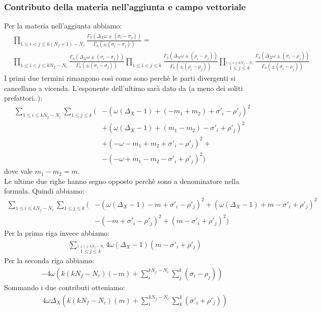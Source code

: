\documentclass[a4paper,12pt]{article}
\begin{document}
\subsubsection{Contributo della materia nell'aggiunta e campo vettoriale }
Per la materia nell'aggiunta abbiamo:
\begin{align*}
& \prod_{ 1 \leq i<j \leq k(N_f+1)- N_c } \frac{ \Gamma_h( \Delta_X \omega \pm (\sigma_i - \sigma_j)) }{ \Gamma_h ( \pm (\sigma_i - \sigma_j) )} = \\
& \prod_{ 1 \leq i<j \leq kN_f- N_c } \frac{ \Gamma_h( \Delta_X \omega \pm (\sigma_i - \sigma_j)) }{ \Gamma_h ( \pm (\sigma_i - \sigma_j) )} 
 \prod_{ 1 \leq i<j \leq k } \frac{ \Gamma_h( \Delta_X \omega \pm (\rho_i - \rho_j)) }{ \Gamma_h ( \pm (\rho_i - \rho_j) )} 
 \prod_{ \overset{1 \leq i \leq kN_f- N_c }{ 1 \leq j \leq k }} \frac{ \Gamma_h( \Delta_X \omega \pm (\sigma_i - \rho_j)) }{ \Gamma_h ( \pm (\sigma_i - \rho_j) )} 
\end{align*}
I primi due termini rimangono così come sono perchè le parti divergenti si cancellano a vicenda.
L'esponente dell'ultimo sarà dato da (a meno dei soliti prefattori..):
\begin{align*}
\sum_{1 \leq i \leq kN_f- N_c } \sum_{ 1 \leq j \leq k }  \bigg( &  - \left( \omega( \Delta_X -1) + ( -m_1 + m_2)  + \sigma'_i - \rho'_j \right)^2 \\
& + \left(  \omega( \Delta_X -1) + ( m_1 - m_2)  - \sigma'_i + \rho'_j\right)^2 \\
& + \left( -\omega  - m_1 + m_2  + \sigma'_i - \rho'_j \right)^2 + \\
& - \left( -\omega +  m_1 - m_2  - \sigma'_i + \rho'_j\right)^2 
\bigg)
\end{align*}
dove vale $ m_1 - m_2 = m$.\\
Le ultime due righe hanno segno opposto perchè sono a denominatore nella formula.
Quindi abbiamo:
\begin{align*}
\sum_{1 \leq i \leq kN_f- N_c } \sum_{ 1 \leq j \leq k }  \bigg( &  - \left( \omega( \Delta_X -1) -m  + \sigma'_i - \rho'_j \right)^2  + \left(  \omega( \Delta_X -1) + m  - \sigma'_i + \rho'_j\right)^2 \\
& -\left(  -m  + \sigma'_i - \rho'_j \right)^2  + \left( m - \sigma'_i + \rho'_j\right)^2 
\bigg)
\end{align*}
Per la prima riga invece abbiamo:
\begin{align*}
& \sum_{ \overset{1 \leq i \leq kN_f- N_c }{ 1 \leq j \leq k }} 4 \omega ( \Delta_X -1) ( m - \sigma'_i + \rho'_j)
\end{align*} 
Per la seconda riga abbiamo:
\begin{align*}
- 4 \omega \left( k ( k N_f - N_c )  ( - m ) + \sum_i^{k N_f - N_c} \sum_j^{k} ( \sigma_i - \rho_j) \right)
\end{align*}
Sommando i due contributi otteniamo:
\begin{align*}
&  4 \omega \Delta_X \left( k ( k N_f - N_c)   (m ) + \sum_i^{k N_f -N_c} \sum_k^{k }  ( \sigma'_i + \rho'_j)\right)
\end{align*}
\end{document}
